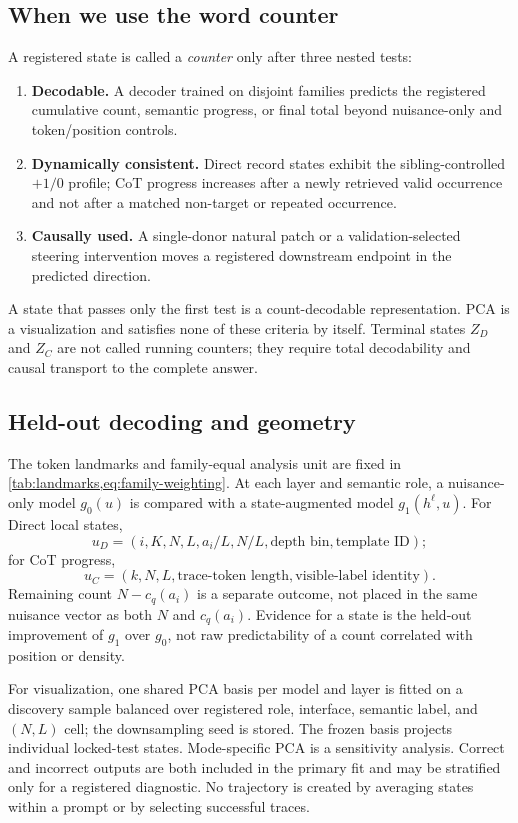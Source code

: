 \subsection{When we use the word counter}

A registered state is called a \emph{counter} only after three nested tests:
\begin{enumerate}
  \item \textbf{Decodable.} A decoder trained on disjoint families predicts
  the registered cumulative count, semantic progress, or final total beyond
  nuisance-only and token/position controls.
  \item \textbf{Dynamically consistent.} Direct record states exhibit the
  sibling-controlled \(+1/0\) profile; CoT progress increases after a newly
  retrieved valid occurrence and not after a matched non-target or repeated
  occurrence.
  \item \textbf{Causally used.} A single-donor natural patch or a
  validation-selected steering intervention moves a registered downstream
  endpoint in the predicted direction.
\end{enumerate}
A state that passes only the first test is a count-decodable
representation. PCA is a visualization and satisfies none of these criteria
by itself. Terminal states \(Z_D\) and \(Z_C\) are not called running counters;
they require total decodability and causal transport to the complete answer.

\subsection{Held-out decoding and geometry}

The token landmarks and family-equal analysis unit are fixed in
\cref{tab:landmarks,eq:family-weighting}. At each layer and semantic role, a
nuisance-only model \(g_0(u)\) is compared with a state-augmented model
\(g_1(h^\ell,u)\). For Direct local states,
\[
  u_D=(i,K,N,L,a_i/L,N/L,\text{depth bin},\text{template ID});
\]
for CoT progress,
\[
  u_C=(k,N,L,\text{trace-token length},\text{visible-label identity}).
\]
Remaining count \(N-c_q(a_i)\) is a separate outcome, not placed in the same
nuisance vector as both \(N\) and \(c_q(a_i)\). Evidence for a state is the
held-out improvement of \(g_1\) over \(g_0\), not raw predictability of a
count correlated with position or density.

For visualization, one shared PCA basis per model and layer is fitted on a
discovery sample balanced over registered role, interface, semantic label,
and \((N,L)\) cell; the downsampling seed is stored. The frozen basis projects
individual locked-test states. Mode-specific PCA is a sensitivity analysis.
Correct and incorrect outputs are both included in the primary fit and may be
stratified only for a registered diagnostic. No trajectory is created by
averaging states within a prompt or by selecting successful traces.

